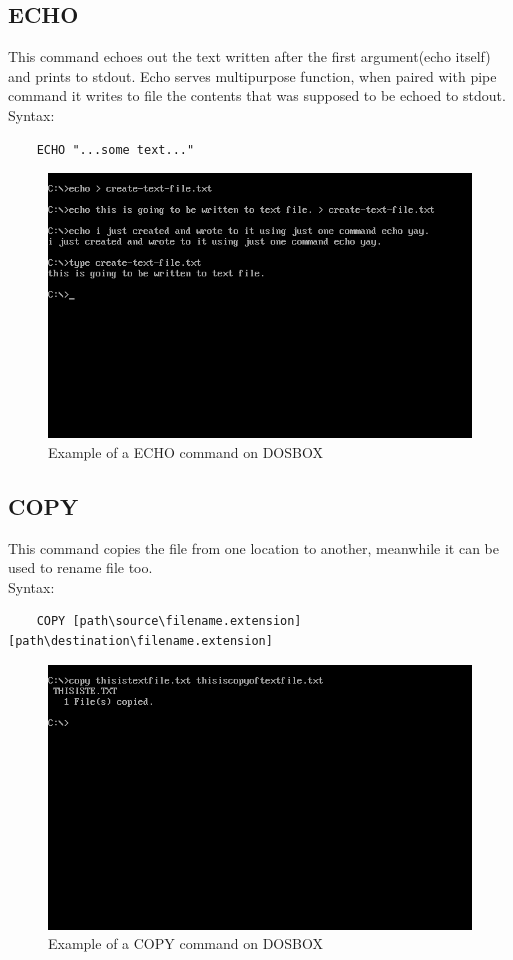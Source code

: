 \documentclass[17pt,a4paper,oneside,margin=1in]{article}
\begin{document}
\subsection{ECHO}
This command echoes out the text written after the first argument(echo itself) and prints to stdout.
Echo serves multipurpose function, when paired with pipe command it writes to file the contents that was supposed to be echoed to stdout.\\
Syntax: \\
\begin{verbatim}
	ECHO "...some text..."  	
\end{verbatim}
\begin{figure}[h]
	\caption{Example of a ECHO command on DOSBOX}
	\centering
	\includegraphics[width=1\textwidth]{./scrot/echo.png}
\end{figure}
\pagebreak


\subsection{COPY}
This command copies the file from one location to another, meanwhile it can be used to rename file too.\\
Syntax: \\
\begin{verbatim}
	COPY [path\source\filename.extension][path\destination\filename.extension]  	
\end{verbatim}
\begin{figure}[h]
	\caption{Example of a COPY command on DOSBOX}
	\centering
	\includegraphics[width=1\textwidth]{./scrot/copy.png}
\end{figure}
\pagebreak
\end{document}
